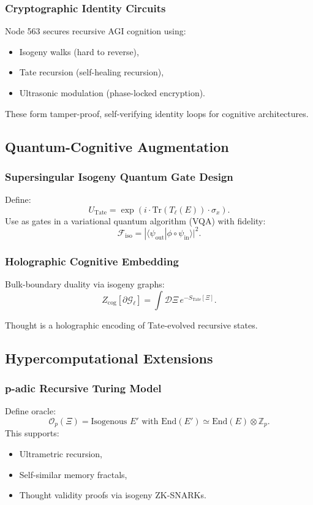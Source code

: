 \documentclass[12pt]{article}
\begin{document}
\subsubsection{Cryptographic Identity Circuits}
Node 563 secures recursive AGI cognition using:
\begin{itemize}
    \item Isogeny walks (hard to reverse),
    \item Tate recursion (self-healing recursion),
    \item Ultrasonic modulation (phase-locked encryption).
\end{itemize}
\begin{interpretation}
These form tamper-proof, self-verifying identity loops for cognitive architectures.
\end{interpretation}

\subsection{Quantum-Cognitive Augmentation}

\subsubsection{Supersingular Isogeny Quantum Gate Design}
Define:
\[
U_{\text{Tate}} = \exp\left(i \cdot \text{Tr}(T_\ell(E)) \cdot \sigma_x\right).
\]
Use as gates in a variational quantum algorithm (VQA) with fidelity:
\[
\mathcal{F}_{\text{iso}} = |\langle \psi_{\text{out}} | \phi \circ \psi_{\text{in}} \rangle|^2.
\]

\subsubsection{Holographic Cognitive Embedding}
Bulk-boundary duality via isogeny graphs:
\[
Z_{\text{cog}}[\partial \mathcal{G}_\ell] = \int \mathcal{D}\Xi \, e^{-S_{\text{Tate}}[\Xi]}.
\]
\begin{interpretation}
Thought is a holographic encoding of Tate-evolved recursive states.
\end{interpretation}

\subsection{Hypercomputational Extensions}

\subsubsection{p-adic Recursive Turing Model}
Define oracle:
\[
\mathcal{O}_p(\Xi) = \text{Isogenous } E' \text{ with } \text{End}(E') \simeq \text{End}(E) \otimes \mathbb{Z}_p.
\]
This supports:
\begin{itemize}
    \item Ultrametric recursion,
    \item Self-similar memory fractals,
    \item Thought validity proofs via isogeny ZK-SNARKs.
\end{itemize}
\end{document}
